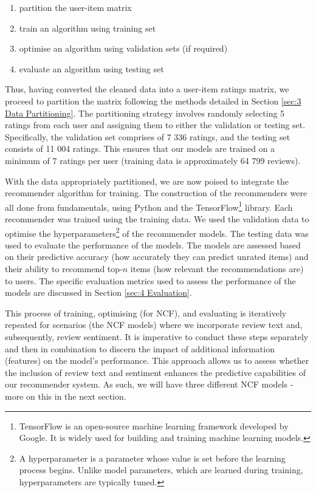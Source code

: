 \begin{enumerate}
    \item partition the user-item matrix
    \item train an algorithm using training set
    \item optimise an algorithm using validation sets (if required)
    \item evaluate an algorithm using testing set
\end{enumerate}

Thus, having converted the cleaned data into a user-item ratings matrix, we proceed to partition the matrix following the methods detailed in Section \ref{sec:3 Data Partitioning}. The partitioning strategy involves randomly selecting $5$ ratings from each user and assigning them to either the validation or testing set. Specifically, the validation set comprises of 7 336 ratings, and the testing set consists of 11 004 ratings. This ensures that our models are trained on a minimum of 7 ratings per user (training data is approximately 64 799 reviews).

With the data appropriately partitioned, we are now poised to integrate the recommender algorithm for training. The construction of the recommenders were all done from fundamentals, using Python and the TensorFlow\footnote{TensorFlow is an open-source machine learning framework developed by Google. It is widely used for building and training machine learning models.} library. Each recommender was trained using the training data. We used the validation data to optimise the hyperparameters\footnote{A hyperparameter is a parameter whose value is set before the learning process begins. Unlike model parameters, which are learned during training, hyperparameters are typically tuned.} of the recommender models. The testing data was used to evaluate the performance of the models.  The models are assessed based on their predictive accuracy (how accurately they can predict unrated items) and their ability to recommend top-$n$ items (how relevant the recommendations are) to users. The specific evaluation metrics used to assess the performance of the models are discussed in Section \ref{sec:4 Evaluation}.

This process of training, optimising (for NCF), and evaluating is iteratively repeated for scenarios (the NCF models) where we incorporate review text and, subsequently, review sentiment. It is imperative to conduct these steps separately and then in combination to discern the impact of additional information (features) on the model's performance. This approach allows us to assess whether the inclusion of review text and sentiment enhances the predictive capabilities of our recommender system. As such, we will have three different NCF models - more on this in the next section. 

